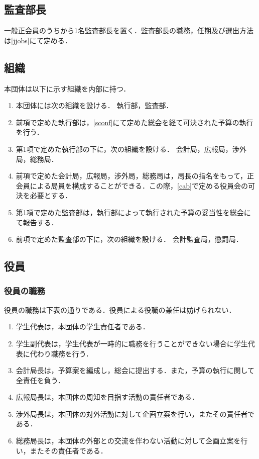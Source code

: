\documentclass{ltjsarticle}
\begin{document}
    \subsection{監査部長}
      \jor
      一般正会員のうちから1名監査部長を置く．監査部長の職務，任期及び選出方法は\ref{jjobs}にて定める．
    \subsection{組織}
      \jor
      本団体は以下に示す組織を内部に持つ．
      \begin{enumerate}
        \item 本団体には次の組織を設ける． 執行部，監査部．
        \item 前項で定めた執行部は，\ref{sconf}にて定めた総会を経て可決された予算の執行を行う．
        \item 第1項で定めた執行部の下に，次の組織を設ける． 会計局，広報局，渉外局，総務局．
        \item 前項で定めた会計局，広報局，渉外局，総務局は，局長の指名をもって，正会員による局員を構成することができる．この際，\ref{cab}で定める役員会の可決を必要とする．
        \item 第1項で定めた監査部は，執行部によって執行された予算の妥当性を総会にて報告する．
        \item 前項で定めた監査部の下に，次の組織を設ける． 会計監査局，懲罰局．
      \end{enumerate}
    \subsection{役員}
      \subsubsection{役員の職務}\label{jobs}
        \jor
        役員の職務は下表の通りである．役員による役職の兼任は妨げられない．
        \begin{enumerate}
            \item 学生代表は，本団体の学生責任者である． 
            \item 学生副代表は，学生代表が一時的に職務を行うことができない場合に学生代表に代わり職務を行う．
            \item 会計局長は，予算案を編成し，総会に提出する．また，予算の執行に関して全責任を負う．
            \item 広報局長は，本団体の周知を目指す活動の責任者である．
            \item 渉外局長は，本団体の対外活動に対して企画立案を行い，またその責任者である．
            \item 総務局長は，本団体の外部との交流を伴わない活動に対して企画立案を行い，またその責任者である．
        \end{enumerate}
\end{document}
